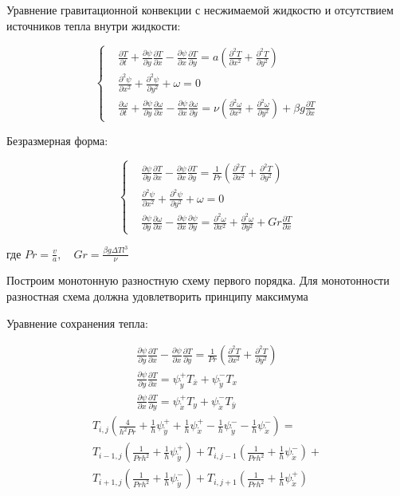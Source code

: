 \documentclass[a4paper, 12pt]{article}
\numberwithin{equation}{section}
\newcommand{\der}[2]{\frac{\partial {#1}}{\partial {#2}}}
\newcommand{\dder}[2]{\frac{\partial^2 {#1}}{\partial {#2}^2}}
\newcommand{\psp}[2]{\psi_{\mathring{#1}}^{#2}}
\begin{document}
  Уравнение гравитационной конвекции с несжимаемой жидкостю и отсутствием
  источников тепла внутри жидкости:

  $$
    \left\{
      \begin{aligned}
        &\der{T}{t} + \der{\psi}{y} \der{T}{x} - \der{\psi}{x} \der{T}{y} =
          a \left( \dder{T}{x} + \dder{T}{y} \right)
        \\
        &\dder{\psi}{x} + \dder{\psi}{y} + \omega = 0
        \\
        &\der{\omega}{t} + \der{\psi}{y} \der{\omega}{x} - \der{\psi}{x}
          \der{\omega}{y} = \nu \left(
            \dder{\omega}{x} + \dder{\omega}{y}
          \right) + \beta g \der{T}{x}
      \end{aligned}
    \right.
  $$

  Безразмерная форма:

  $$
    \left\{
      \begin{aligned}
        &\der{\psi}{y} \der{T}{x} - \der{\psi}{x} \der{T}{y} = \frac{1}{Pr}
          \left( \dder{T}{x} + \dder{T}{y} \right)
        \\
        &\dder{\psi}{x} + \dder{\psi}{y} + \omega = 0
        \\
        &\der{\psi}{y} \der{\omega}{x} - \der{\psi}{x} \der{\psi}{y} =
          \dder{\omega}{x} + \dder{\omega}{y} + Gr \der{T}{x}
      \end{aligned}
    \right.
  $$

  где $Pr = \frac{v}{a}, \quad Gr = \frac{\beta g \Delta T l^{3}}{\nu}$

  Построим монотонную разностную схему первого порядка. Для монотонности
  разностная схема должна удовлетворить принципу максимума

  Уравнение сохранения тепла:

  \begin{gather*}
    \der{\psi}{y} \der{T}{x} - \der{\psi}{x} \der{T}{y} = \frac{1}{Pr}
      \left( \dder{T}{x} + \dder{T}{y} \right)
    \\
    \der{\psi}{y} \der{T}{x} = \psp{y}{+} T_{\overline{x}} + \psp{y}{-} T_{x}
    \\
    \der{\psi}{x} \der{T}{y} = \psp{x}{+} T_{y} + \psp{x}{-} T_{\overline{y}}
  \end{gather*}
  \begin{multline*}
    T_{i,j}\left(
      \frac{4}{h^2 Pr} + \frac{1}{h} \psp{y}{+} + \frac{1}{h} \psp{x}{+} -
      \frac{1}{h} \psp{y}{-} - \frac{1}{h} \psp{x}{-}
    \right) = \\
      T_{i-1,j}\left(
        \frac{1}{Pr h^2} + \frac{1}{h} \psp{y}{+}
      \right) +
      T_{i,j-1}\left(
        \frac{1}{Pr h^2} + \frac{1}{h} \psp{x}{-}
      \right) + \\
      T_{i+1,j}\left(
        \frac{1}{Pr h^2} + \frac{1}{h} \psp{y}{-}
      \right) +
      T_{i,j+1}\left(
        \frac{1}{Pr h^2} + \frac{1}{h} \psp{x}{+}
      \right)
  \end{multline*}
\end{document}
